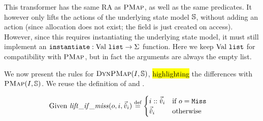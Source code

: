 This transformer has the same RA as $\textsc{PMap}$, as well as the same predicates. It however only lifts the actions of the underlying state model $\mathbb S$, without adding an \alloc{} action (since allocation does not exist; the field is just created on access). However, since this requires instantiating the underlying state model, it must still implement an ${\texttt{instantiate}: \text{Val}~\texttt{list} \rightarrow \Sigma}$ function. Here we keep $\text{Val}~\texttt{list}$ for compatibility with $\textsc{PMap}$, but in fact the arguments are always the empty list.

We now present the rules for $\textsc{DynPMap}(I,\mathbb S)$, \hl{highlighting} the differences with $\textsc{PMap}(I,\mathbb S)$. We reuse the definition of  and .

\begin{align*}
	\text{Given }
	\mathit{lift\_if\_miss}(o, i, \vec{\hat{v}}_i) &\stackrel{\textnormal{def}}= \begin{cases}
		i :: \vec{\hat{v}}_i &\text{if}~o=\texttt{Miss}\\
		\vec{\hat{v}}_i &\text{otherwise}
	\end{cases}
\end{align*}
